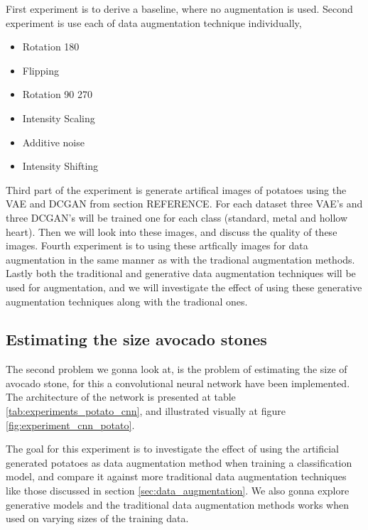 \documentclass[11pt]{article}
\begin{document}
First experiment is to derive a baseline, where no augmentation is used. Second experiment is use each of data augmentation technique individually,
\begin{itemize}
    \item Rotation 180
    \item Flipping
    \item Rotation 90 270
    \item Intensity Scaling
    \item Additive noise
    \item Intensity Shifting
\end{itemize}
Third part of the experiment is generate artifical images of potatoes using the VAE and DCGAN from section REFERENCE. For each dataset three VAE's and three DCGAN's will be trained one for each class (standard, metal and hollow heart). Then we will look into these images, and discuss the quality of these images. Fourth experiment is to using these artfically images for data augmentation in the same manner as with the tradional augmentation methods. Lastly both the traditional and generative data augmentation techniques will be used for augmentation, and we will investigate the effect of using these generative augmentation techniques along with the tradional ones.



\subsection{Estimating the size avocado stones}

The second problem we gonna look at, is the problem of estimating the size of avocado stone, for this a convolutional neural network have been implemented. The architecture of the network is presented at table \ref{tab:experiments_potato_cnn}, and illustrated visually at figure \ref{fig:experiment_cnn_potato}. 


The goal for this experiment is to investigate the effect of using the artificial generated potatoes as data augmentation method when training a classification model, and compare it against more traditional data augmentation techniques like those discussed in section \ref{sec:data_augmentation}. We also gonna explore generative models and the traditional data augmentation methods works when used on varying sizes of the training data. 
\\ \\
\end{document}

